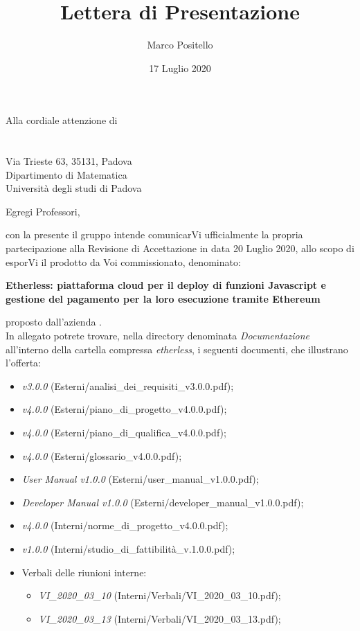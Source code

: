 \documentclass[a4paper]{letter}
\title{Lettera di Presentazione}
\author{Marco Positello}
\begin{document}
\begin{letter} {Alla cordiale attenzione di \\ \TV \\ \RC \\ Via Trieste 63, 35131, Padova\\ Dipartimento di Matematica \\ Università degli studi di Padova }
  \vspace*{-0.4\baselineskip}
\date{17 Luglio 2020}
\opening{Egregi Professori,}
con la presente il gruppo \Gruppo{} intende comunicarVi ufficialmente la propria partecipazione alla Revisione di Accettazione in data 20 Luglio 2020, allo scopo di esporVi il prodotto da Voi commissionato, denominato:
  \begin{center}
    \textbf{Etherless: piattaforma cloud per il deploy di funzioni Javascript e gestione del pagamento per la loro esecuzione tramite Ethereum}
  \end{center}
  proposto dall'azienda \Proponente.\\
  In allegato potrete trovare, nella directory denominata \textit{Documentazione} all'interno della cartella compressa \textit{etherless}, i seguenti documenti, che illustrano l'offerta:
  \begin{itemize}
    \item \AdR{} \textit{v3.0.0} (Esterni/analisi\_dei\_requisiti\_v3.0.0.pdf);
    \item \PdP{} \textit{v4.0.0} (Esterni/piano\_di\_progetto\_v4.0.0.pdf);
    \item \PdQ{} \textit{v4.0.0} (Esterni/piano\_di\_qualifica\_v4.0.0.pdf);
    \item \Glossario{} \textit{v4.0.0} (Esterni/glossario\_v4.0.0.pdf);
		\item \textit{User Manual v1.0.0} (Esterni/user\_manual\_v1.0.0.pdf);
		\item \textit{Developer Manual v1.0.0} (Esterni/developer\_manual\_v1.0.0.pdf);
    \item \NdP{} \textit{v4.0.0} (Interni/norme\_di\_progetto\_v4.0.0.pdf);
    \item \SdF{} \textit{v1.0.0} (Interni/studio\_di\_fattibilità\_v.1.0.0.pdf);
    \item Verbali delle riunioni interne:
      \begin{itemize}
      				\item \textit{VI\_2020\_03\_10} (Interni/Verbali/VI\_2020\_03\_10.pdf);
				\item \textit{VI\_2020\_03\_13} (Interni/Verbali/VI\_2020\_03\_13.pdf);

\end{itemize}
\end{itemize}
\end{letter}
\end{document}
